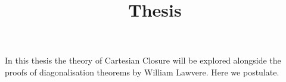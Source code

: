 \documentclass[a4paper, 12pt]{article}
\date{}
\title{Thesis}
\begin{document}
\maketitle
In this thesis the theory of Cartesian Closure will be explored alongside the proofs of diagonalisation theorems by William Lawvere.
Here we postulate.

\begin{code}%
%
\>[2]\AgdaSpace{}%
\AgdaSpace{}%
\<%
\end{code}
\end{document}
